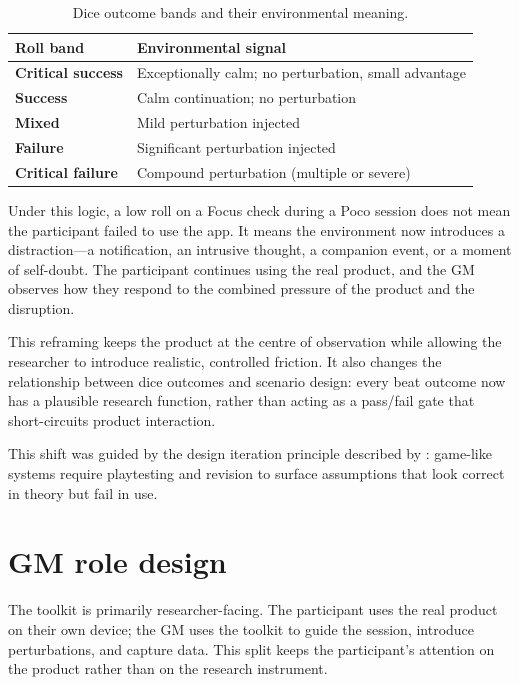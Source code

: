 \documentclass[12pt,a4paper]{report}
\begin{document}
\begin{table}[h]
\centering
\small
\begin{tabularx}{\textwidth}{>{\bfseries}p{}Y}
\toprule
Roll band & Environmental signal \\
\midrule
Critical success & Exceptionally calm; no perturbation, small advantage \\
Success          & Calm continuation; no perturbation \\
Mixed            & Mild perturbation injected \\
Failure          & Significant perturbation injected \\
Critical failure & Compound perturbation (multiple or severe) \\
\bottomrule
\end{tabularx}
\caption{Dice outcome bands and their environmental meaning.}
\end{table}

Under this logic, a low roll on a Focus check during a Poco session does not mean the
participant failed to use the app.
It means the environment now introduces a distraction---a notification, an intrusive
thought, a companion event, or a moment of self-doubt.
The participant continues using the real product, and the GM observes how they respond to
the combined pressure of the product and the disruption.

This reframing keeps the product at the centre of observation while allowing the
researcher to introduce realistic, controlled friction.
It also changes the relationship between dice outcomes and scenario design: every beat
outcome now has a plausible research function, rather than acting as a pass/fail gate
that short-circuits product interaction.

This shift was guided by the design iteration principle described by
\citet{fullerton2018game}: game-like systems require playtesting and revision to surface
assumptions that look correct in theory but fail in use.

\section{GM role design}

The toolkit is primarily researcher-facing.
The participant uses the real product on their own device; the GM uses the toolkit to
guide the session, introduce perturbations, and capture data.
This split keeps the participant's attention on the product rather than on the research
instrument.
\end{document}
